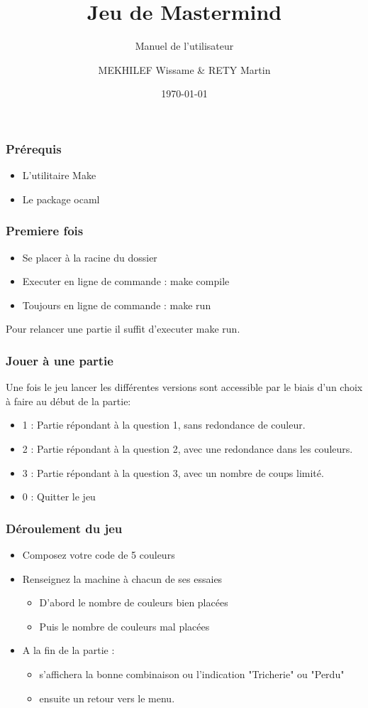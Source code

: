 \documentclass{beamer}
\title{Jeu de Mastermind}
\subtitle{Manuel de l'utilisateur}
\author{MEKHILEF Wissame \& RETY Martin}
\institute{Université d'Orléans}
\date{\today}
\begin{document}
  \begin{frame}
   \titlepage
  \end{frame}

  \begin{frame}
   \frametitle{Prérequis}
   \begin{itemize}
    \item L'utilitaire Make
    \item Le package ocaml
   \end{itemize}
   \end{frame}
   
  \begin{frame}
    \frametitle{Premiere fois}
    \begin{itemize}
     \item Se placer à la racine du dossier
     \item Executer en ligne de commande  : make compile
     \item Toujours en ligne de commande  : make run
    \end{itemize}
    Pour relancer une partie il suffit d'executer make run.
  \end{frame}

  \begin{frame}
   \frametitle{Jouer à une partie}
   Une fois le jeu lancer les différentes versions sont accessible par le biais d'un choix à faire au début de la partie:
   \begin{itemize}
    \item 1 : Partie répondant à la question 1, sans redondance de couleur.
    \item 2 : Partie répondant à la question 2, avec une redondance dans les couleurs.
    \item 3 : Partie répondant à la question 3, avec un nombre de coups limité.
	\item 0 : Quitter le jeu
   \end{itemize}
  \end{frame}
  
  \begin{frame}
   \frametitle{Déroulement du jeu}
   \begin{itemize}
    \item Composez votre code de 5 couleurs
    \item Renseignez la machine à chacun de ses essaies
    \begin{itemize}
     \item D'abord le nombre de couleurs bien placées
     \item Puis le nombre de couleurs mal placées
    \end{itemize}
	\item A la fin de la partie :
	\begin{itemize}
	 \item s'affichera la bonne combinaison ou l'indication "Tricherie" ou "Perdu"
	 \item ensuite un retour vers le menu.
	\end{itemize} 
   \end{itemize}
  \end{frame}
\end{document}
